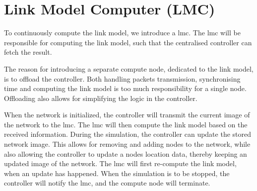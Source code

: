 \section{Link Model Computer (LMC)}\label{sec:mpi:lmc}
To continuously compute the link model, we introduce a \gls{lmc}. The \gls{lmc} will be responsible for computing the link model, such that the centralised controller can fetch the result.

The reason for introducing a separate compute node, dedicated to the link model, is to offload the controller. Both handling packets transmission, synchronising time and computing the link model is too much responsibility for a single node. Offloading also allows for simplifying the logic in the controller.

When the network is initialized, the controller will transmit the current image of the network to the \gls{lmc}. The \gls{lmc} will then compute the link model based on the received information. During the simulation, the controller can update the stored network image. This allows for removing and adding nodes to the network, while also allowing the controller to update a nodes location data, thereby keeping an updated image of the network. The \gls{lmc} will first re-compute the link model, when an update has happened. When the simulation is to be stopped, the controller will notify the \gls{lmc}, and the compute node will terminate.